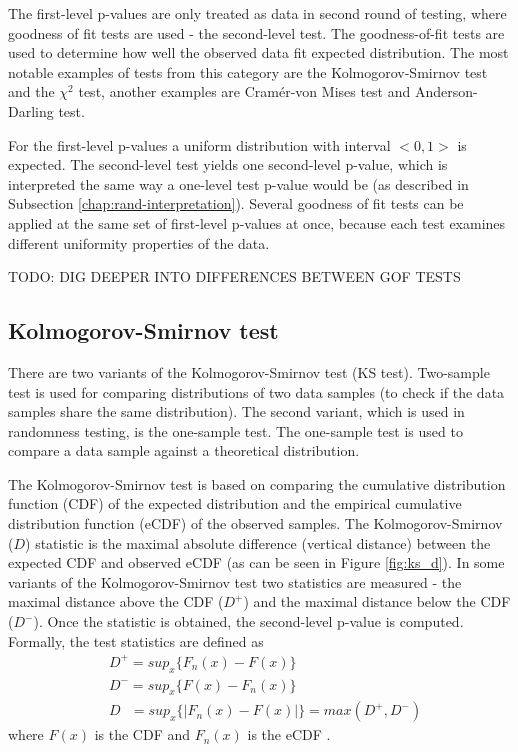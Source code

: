\documentclass[
  digital,     %
  oneside,     %
  nosansbold,  %
  nocolorbold, %
  nolof,         %
  nolot,         %
]{fithesis4}
\begin{document}
The first-level p-values are only treated as data in second round of testing, where goodness of fit tests are used - the second-level test. The goodness-of-fit tests are used to determine how well the observed data fit expected distribution. The most notable examples of tests from this category are the Kolmogorov-Smirnov test and the $\chi^2$ test, another examples are Cramér-von Mises test and Anderson-Darling test. 

For the first-level p-values a uniform distribution with interval $<0,1>$ is expected. The second-level test yields one second-level p-value, which is interpreted the same way a one-level test p-value would be (as described in Subsection \ref{chap:rand-interpretation}). Several goodness of fit tests can be applied at the same set of first-level p-values at once, because each test examines different uniformity properties of the data.

TODO: DIG DEEPER INTO DIFFERENCES BETWEEN GOF TESTS

\subsection{Kolmogorov-Smirnov test}
There are two variants of the Kolmogorov-Smirnov test (KS test). Two-sample test is used for comparing distributions of two data samples (to check if the data samples share the same distribution). The second variant, which is used in randomness testing, is the one-sample test. The one-sample test is used to compare a data sample against a theoretical distribution.

The Kolmogorov-Smirnov test is based on comparing the cumulative distribution function (CDF) of the expected distribution and the empirical cumulative distribution function (eCDF) of the observed samples. The Kolmogorov-Smirnov ($D$) statistic is the maximal absolute difference (vertical distance) between the expected CDF and observed eCDF (as can be seen in Figure \ref{fig:ks_d}). In some variants of the Kolmogorov-Smirnov test two statistics are measured - the maximal distance above the CDF ($D^+$) and the maximal distance below the CDF ($D^-$). Once the statistic is obtained, the second-level p-value is computed. Formally, the test statistics are defined as
\[\begin{split}
    &D^+ = sup_x\{F_n(x) - F(x)\}\\
    &D^- = sup_x\{F(x) - F_n(x)\}\\
    &D \:\:\:= sup_x\{|F_n(x) - F(x)|\} = max(D^+, D^-)
\end{split}
\] where $F(x)$ is the CDF and $F_n(x)$ is the  eCDF \cite[p. 100]{GOF-techniques}.
\end{document}
